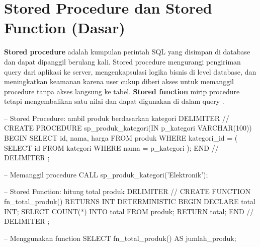 \section{Stored Procedure dan Stored Function (Dasar)}

\textbf{Stored procedure} adalah kumpulan perintah SQL yang disimpan di database dan dapat dipanggil berulang kali. Stored procedure mengurangi pengiriman query dari aplikasi ke server, mengenkapsulasi logika bisnis di level database, dan meningkatkan keamanan karena user cukup diberi akses untuk memanggil procedure tanpa akses langsung ke tabel. \textbf{Stored function} mirip procedure tetapi mengembalikan satu nilai dan dapat digunakan di dalam query \cite{mysqlDocs}.

\begin{webcode}[language=SQL, caption={Stored procedure dan function}]
-- Stored Procedure: ambil produk berdasarkan kategori
DELIMITER //
CREATE PROCEDURE sp_produk_kategori(IN p_kategori VARCHAR(100))
BEGIN
  SELECT id, nama, harga FROM produk
  WHERE kategori_id = (
    SELECT id FROM kategori WHERE nama = p_kategori
  );
END //
DELIMITER ;

-- Memanggil procedure
CALL sp_produk_kategori('Elektronik');

-- Stored Function: hitung total produk
DELIMITER //
CREATE FUNCTION fn_total_produk() RETURNS INT
DETERMINISTIC
BEGIN
  DECLARE total INT;
  SELECT COUNT(*) INTO total FROM produk;
  RETURN total;
END //
DELIMITER ;

-- Menggunakan function
SELECT fn_total_produk() AS jumlah_produk;
\end{webcode}

